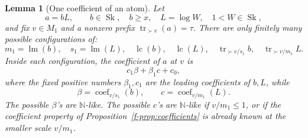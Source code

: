 \documentclass[11pt]{article}
\newtheorem{lemma}[theorem]{Lemma}
\theoremstyle{definition}
\theoremstyle{remark}
\newcommand{\Sk}{\operatorname{Sk}}
\newcommand{\N}{\mathbb N}
\newcommand{\tr}{\operatorname{tr}}
\newcommand{\lm}{\operatorname{lm}}
\newcommand{\lc}{\operatorname{lc}}
\DeclareMathOperator{\coef}{coef}
\numberwithin{equation}{section}
\begin{document}
\begin{lemma}[One coefficient of an atom]\label{f-lem:atom}
Let
\[
 a=bL,\qquad b\in\Sk,\quad b\ge x,\quad L=\log W,\quad
                  1<W\in\Sk,
\]
and fix \(v\in M_1\) and a nonzero prefix
\(\tr_{\succ v}(a)=\tau\).
There are only finitely many possible configurations of:
\begin{equation}
 m_1=\lm(b),\quad s_1=\lm(L),\quad
 \lc(b),\quad\lc(L),\quad
 \tr_{\succ v/s_1}b,\quad\tr_{\succ v/m_1}L.
 \label{f-eq-3.1}
\end{equation}
Inside each configuration, the coefficient of \(a\) at \(v\) is
\begin{equation}
 c_1\beta+\beta_1c+c_0,
 \label{f-eq-3.2}
\end{equation}
where the fixed positive numbers \(\beta_1,c_1\) are the leading
coefficients of \(b,L\), while
\[
 \beta=\coef_{v/s_1}(b),\qquad
 c=\coef_{v/m_1}(L).
\]
The possible \(\beta\)'s are \(\N\)-like.
The possible \(c\)'s are \(\N\)-like if \(v/m_1\le1\), or if the
coefficient property of Proposition~\ref{f-prop:coefficients} is
already known at the smaller scale \(v/m_1\).
\end{lemma}
\end{document}
